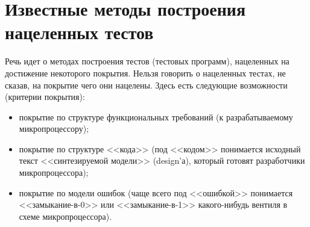 \documentclass[14pt]{extreport}
\newcommand{\LRU}{\textsf{LRU}\xspace}
\newcommand{\FIFO}{\textsf{FIFO}\xspace}
\begin{document}




%


\section{Известные методы построения нацеленных тестов}

Речь идет о методах построения тестов (тестовых программ), нацеленных на достижение некоторого покрытия. Нельзя говорить о нацеленных тестах, не сказав, на покрытие чего они нацелены. Здесь есть следующие возможности (критерии покрытия):
\begin{itemize}
	\item покрытие по структуре функциональных требований (к разрабатываемому микропроцессору);
	\item покрытие по структуре <<кода>> (под <<кодом>> понимается исходный текст <<синтезируемой модели>> (design'а), который готовят разработчики микропроцессора);
	\item покрытие по модели ошибок (чаще всего под <<ошибкой>> понимается <<замыкание-в-0>> или <<замыкание-в-1>> какого-нибудь вентиля в схеме микропроцессора).
\end{itemize}
\end{document}
